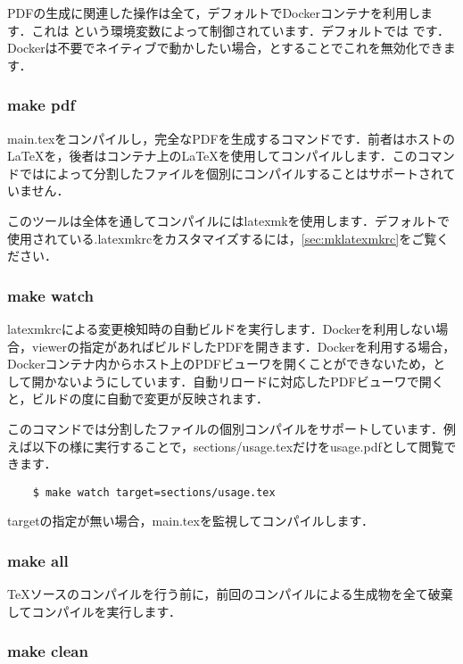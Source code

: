 \documentclass[main]{subfiles}
\begin{document}
PDFの生成に関連した操作は全て，デフォルトでDockerコンテナを利用します．これは  という環境変数によって制御されています．デフォルトでは  です．
Dockerは不要でネイティブで動かしたい場合，とすることでこれを無効化できます．

\subsubsection{make pdf}

main.texをコンパイルし，完全なPDFを生成するコマンドです．前者はホストのLaTeXを，後者はコンテナ上のLaTeXを使用してコンパイルします．このコマンドではによって分割したファイルを個別にコンパイルすることはサポートされていません．

このツールは全体を通してコンパイルにはlatexmkを使用します．デフォルトで使用されている.latexmkrcをカスタマイズするには，\ref{sec:mklatexmkrc}をご覧ください．

\subsubsection{make watch}

latexmkrcによる変更検知時の自動ビルドを実行します．Dockerを利用しない場合，viewerの指定があればビルドしたPDFを開きます．Dockerを利用する場合，Dockerコンテナ内からホスト上のPDFビューワを開くことができないため，として開かないようにしています．自動リロードに対応したPDFビューワで開くと，ビルドの度に自動で変更が反映されます．


このコマンドでは分割したファイルの個別コンパイルをサポートしています．例えば以下の様に実行することで，sections/usage.texだけをusage.pdfとして閲覧できます．

\begin{lstlisting}
    $ make watch target=sections/usage.tex
\end{lstlisting}
targetの指定が無い場合，main.texを監視してコンパイルします．

\subsubsection{make all}

TeXソースのコンパイルを行う前に，前回のコンパイルによる生成物を全て破棄してコンパイルを実行します．

\subsubsection{make clean}
\end{document}
